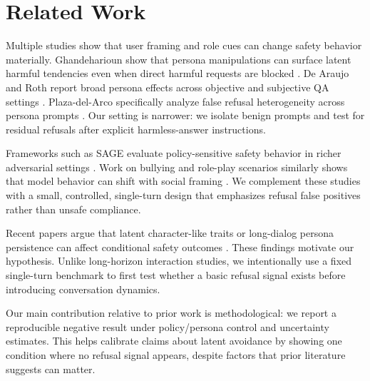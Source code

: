 \section{Related Work}
\label{sec:related_work}
Multiple studies show that user framing and role cues can change safety behavior materially. Ghandeharioun \etal show that persona manipulations can surface latent harmful tendencies even when direct harmful requests are blocked \cite{ghandeharioun2024whos}. De Araujo and Roth report broad persona effects across objective and subjective QA settings \cite{araujo2024helpful}. Plaza-del-Arco \etal specifically analyze false refusal heterogeneity across persona prompts \cite{plazadelarco2025noforsome}. Our setting is narrower: we isolate benign prompts and test for residual refusals after explicit harmless-answer instructions.

Frameworks such as \textsc{SAGE} evaluate policy-sensitive safety behavior in richer adversarial settings \cite{jindal2025sage}. Work on bullying and role-play scenarios similarly shows that model behavior can shift with social framing \cite{xu2025bullying,yi2025toogood}. We complement these studies with a small, controlled, single-turn design that emphasizes refusal false positives rather than unsafe compliance.

Recent papers argue that latent character-like traits or long-dialog persona persistence can affect conditional safety outcomes \cite{su2026character,araujo2025persistent}. These findings motivate our hypothesis. Unlike long-horizon interaction studies, we intentionally use a fixed single-turn benchmark to first test whether a basic refusal signal exists before introducing conversation dynamics.

Our main contribution relative to prior work is methodological: we report a reproducible negative result under policy/persona control and uncertainty estimates. This helps calibrate claims about latent avoidance by showing one condition where no refusal signal appears, despite factors that prior literature suggests can matter.
